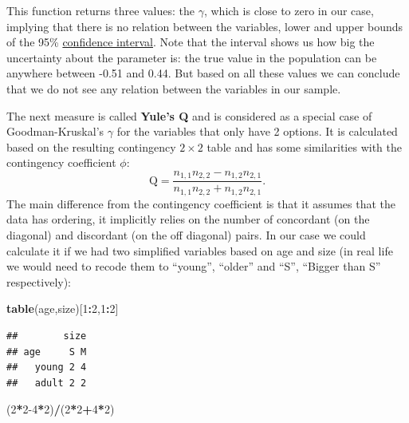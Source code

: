 \documentclass[
]{book}
\newenvironment{Shaded}{\begin{snugshade}}{\end{snugshade}}
\newcommand{\DecValTok}[1]{\textcolor[rgb]{0.00,0.00,0.81}{#1}}
\newcommand{\KeywordTok}[1]{\textcolor[rgb]{0.13,0.29,0.53}{\textbf{#1}}}
\newcommand{\NormalTok}[1]{#1}
\newcommand{\OperatorTok}[1]{\textcolor[rgb]{0.81,0.36,0.00}{\textbf{#1}}}
\theoremstyle{definition}
\theoremstyle{definition}
\theoremstyle{definition}
\theoremstyle{definition}
\theoremstyle{remark}
\begin{document}
This function returns three values: the \(\gamma\), which is close to zero in our case, implying that there is no relation between the variables, lower and upper bounds of the 95\% \protect\hyperlink{confidenceIntervals}{confidence interval}. Note that the interval shows us how big the uncertainty about the parameter is: the true value in the population can be anywhere between -0.51 and 0.44. But based on all these values we can conclude that we do not see any relation between the variables in our sample.

The next measure is called \textbf{Yule's Q} and is considered as a special case of Goodman-Kruskal's \(\gamma\) for the variables that only have 2 options. It is calculated based on the resulting contingency \(2\times 2\) table and has some similarities with the contingency coefficient \(\phi\):
\begin{equation}
    \mathrm{Q} = \frac{n_{1,1} n_{2,2} - n_{1,2} n_{2,1}}{n_{1,1} n_{2,2} + n_{1,2} n_{2,1}} .
    \label{eq:measuresAssociationYule}
\end{equation}
The main difference from the contingency coefficient is that it assumes that the data has ordering, it implicitly relies on the number of concordant (on the diagonal) and discordant (on the off diagonal) pairs. In our case we could calculate it if we had two simplified variables based on age and size (in real life we would need to recode them to ``young'', ``older'' and ``S'', ``Bigger than S'' respectively):

\begin{Shaded}
\begin{Highlighting}[]
\KeywordTok{table}\NormalTok{(age,size)[}\DecValTok{1}\OperatorTok{:}\DecValTok{2}\NormalTok{,}\DecValTok{1}\OperatorTok{:}\DecValTok{2}\NormalTok{]}
\end{Highlighting}
\end{Shaded}

\begin{verbatim}
##        size
## age     S M
##   young 2 4
##   adult 2 2
\end{verbatim}

\begin{Shaded}
\begin{Highlighting}[]
\NormalTok{(}\DecValTok{2}\OperatorTok{*}\DecValTok{2{-}4}\OperatorTok{*}\DecValTok{2}\NormalTok{)}\OperatorTok{/}\NormalTok{(}\DecValTok{2}\OperatorTok{*}\DecValTok{2}\OperatorTok{+}\DecValTok{4}\OperatorTok{*}\DecValTok{2}\NormalTok{)}
\end{Highlighting}
\end{Shaded}
\end{document}
